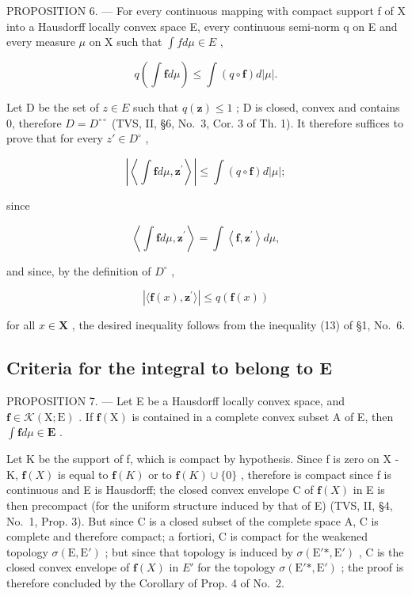 PROPOSITION 6. --- For every continuous mapping with compact support f of X into a Hausdorff locally convex space E, every continuous semi-norm q on E and every measure \(\mu\) on X such that \(\int f d\mu \in E\) ,

\[
q \left(\int \mathbf {f} d \mu\right) \leqslant \int (q \circ \mathbf {f}) d | \mu |.\tag{4}
\]

Let D be the set of \(z \in E\) such that \(q(\mathbf{z}) \leqslant 1\) ; D is closed, convex and contains 0, therefore \(D = D^{\circ\circ}\) (TVS, II, §6, No.~3, Cor. 3 of Th. 1). It therefore suffices to prove that for every \(z' \in D^{\circ}\) ,

\[
\left| \left\langle \int \mathbf {f} d \mu , \mathbf {z} ^ {\prime} \right\rangle \right| \leqslant \int (q \circ \mathbf {f}) d | \mu |;
\]

since

\[
\left\langle \int \mathbf {f} d \mu , \mathbf {z} ^ {\prime} \right\rangle = \int \left\langle \mathbf {f}, \mathbf {z} ^ {\prime} \right\rangle d \mu ,
\]

and since, by the definition of \(D^{\circ}\) ,

\[
| \langle \mathbf {f} (x), \mathbf {z} ^ {\prime} \rangle | \leqslant q (\mathbf {f} (x))
\]

for all \(x \in \mathbf{X}\) , the desired inequality follows from the inequality (13) of §1, No.~6.

\subsection{Criteria for the integral to belong to E}

PROPOSITION 7. --- Let E be a Hausdorff locally convex space, and \(\mathbf{f} \in \mathcal{K}(\mathrm{X};\mathrm{E})\) . If \(\mathbf{f}(\mathrm{X})\) is contained in a complete convex subset A of E, then \(\int \mathbf{f} d\mu \in \mathbf{E}\) .

Let K be the support of f, which is compact by hypothesis. Since f is zero on X - K, \(\mathbf{f}(X)\) is equal to \(\mathbf{f}(K)\) or to \(\mathbf{f}(K) \cup \{0\}\) , therefore is compact since f is continuous and E is Hausdorff; the closed convex envelope C of \(\mathbf{f}(X)\) in E is then precompact (for the uniform structure induced by that of E) (TVS, II, §4, No.~1, Prop. 3). But since C is a closed subset of the complete space A, C is complete and therefore compact; a fortiori, C is compact for the weakened topology \(\sigma(\mathrm{E}, \mathrm{E}')\) ; but since that topology is induced by \(\sigma(\mathrm{E}'*, \mathrm{E}')\) , C is the closed convex envelope of \(\mathbf{f}(X)\) in \(E'\) for the topology \(\sigma(\mathrm{E}'*, \mathrm{E}')\) ; the proof is therefore concluded by the Corollary of Prop. 4 of No.~2.

